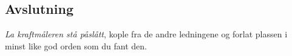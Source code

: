\documentclass[../Elmag-labhefte-2020.tex]{subfiles}
\begin{document}
%


\subsection{Avslutning}
\emph{La kraftmåleren stå påslått}, kople fra de andre ledningene og forlat plassen i minst like god orden som du fant den.
\end{document}
